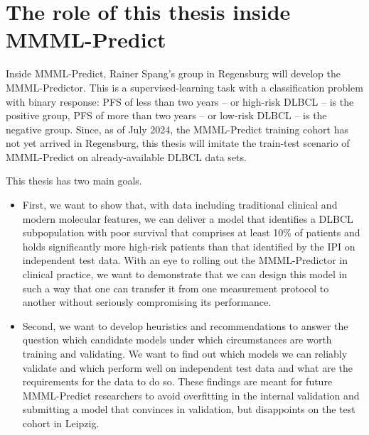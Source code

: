 \section{The role of this thesis inside MMML-Predict}

Inside MMML-Predict, Rainer Spang's group in Regensburg will develop the MMML-Predictor. 
This is 
a supervised-learning task with a classification problem with binary response: PFS of less 
than two years -- or high-risk DLBCL -- is the positive group, PFS of more than two 
years -- or low-risk DLBCL -- is the negative group. Since, as of July 2024, the MMML-Predict 
training cohort has not yet arrived in Regensburg, this thesis will imitate the train-test scenario 
of MMML-Predict on already-available DLBCL data sets. 

This thesis has two main goals.
\begin{itemize}
\item First, we want to show that, with data including traditional clinical and modern 
molecular features, we can deliver a model that identifies a DLBCL subpopulation with poor survival 
that comprises at least \num{10}\% of patients and holds significantly more high-risk patients than 
that identified by the IPI on independent test data. 
With an eye to rolling out the MMML-Predictor in clinical practice, 
we want to demonstrate that we can design this model in such a way that one can transfer it from 
one measurement protocol to another without seriously compromising its performance.
\item Second, we want to develop heuristics and recommendations to answer the question which 
candidate models under which circumstances are worth training and validating. We want to find out 
which models we can reliably validate and which perform well on independent test data and what are 
the requirements for the data to do so. These findings are meant for future MMML-Predict researchers 
to avoid overfitting in the internal validation and submitting a model that convinces 
in validation, but disappoints on the test cohort in Leipzig.
\end{itemize}